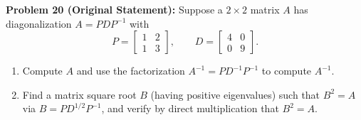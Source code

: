 \documentclass[11pt, letterpaper]{article}
\theoremstyle{definition}
\theoremstyle{remark}
\begin{document}
\vspace{0.8em}
\textbf{Problem 20 (Original Statement):}
Suppose a $2 \times 2$ matrix $A$ has diagonalization $A = PDP^{-1}$ with
\[
P = \begin{bmatrix} 1 & 2 \\ 1 & 3 \end{bmatrix}, \qquad D = \begin{bmatrix} 4 & 0 \\ 0 & 9 \end{bmatrix}.
\]
\begin{enumerate}[label=(\alph*)]
    \item Compute $A$ and use the factorization $A^{-1} = PD^{-1}P^{-1}$ to compute $A^{-1}$.
    \item Find a matrix square root $B$ (having positive eigenvalues) such that $B^{2} = A$ via $B = PD^{1/2}P^{-1}$, and verify by direct multiplication that $B^{2} = A$.
\end{enumerate}
\end{document}
